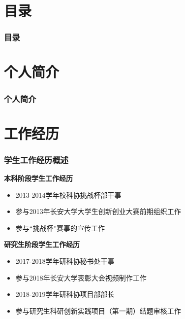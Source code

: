 \documentclass[10pt,aspectratio=43,mathserif]{beamer}
\title[主席团竞选答辩]{\fontsize{13pt}{18pt}\selectfont {主席团竞选答辩}}
\subtitle{\fontsize{9pt}{14pt}\selectfont \textbf{研科协项目部工作总结}}
\author[景旭]{景旭 \\ \texttt{jx\_tdem@qq.com}}
\date[\today]{
 \today}
\begin{document}
\begin{frame}
	\titlepage
\end{frame}				%


\section*{目录}

	\begin{frame}
		\frametitle{\textbf{目录}}
		\textbf{\tableofcontents}
	\end{frame}


\section{个人简介}

	\begin{frame}
		\frametitle{\textbf{个人简介}}
		\fontsize{9pt}{14pt}\selectfont {我是景旭，我来自山西省太原市。自2013年本科考入长安大学，我在这座城市、这个学校已有6年之久。我的专业是
		地球物理学，今年顺利获得硕博连读资格，即将于今年9月开始攻读博士学位。平时在办公室的工作主要是负责课题组项目相
		关的软件开发，闲暇时间会健身、看剧、玩桌游。我的生活作息比较规律，能够有效合理地安排自己每日的时间。待人处事
		方面我比较谦逊随和，学习和工作中与他人交流的事情都可以耐心地处理。}
	\end{frame}



\section{工作经历}

	\begin{frame}
		\frametitle{\textbf{学生工作经历概述}}
		\begin{block}{\textbf{本科阶段学生工作经历}}
			\begin{itemize}
				\item 2013-2014学年校科协挑战杯部干事
				\item 参与2013年长安大学大学生创新创业大赛前期组织工作
				\item 参与“挑战杯”赛事的宣传工作
			\end{itemize}
		\end{block}
		
		\begin{block}{\textbf{研究生阶段学生工作经历}}
			\begin{itemize}
				\item 2017-2018学年研科协秘书处干事
				\item 参与2018年长安大学表彰大会视频制作工作
				\item 2018-2019学年研科协项目部部长
				\item 参与研究生科研创新实践项目（第一期）结题审核工作
			\end{itemize}
		\end{block}
	\end{frame}
\end{document}
